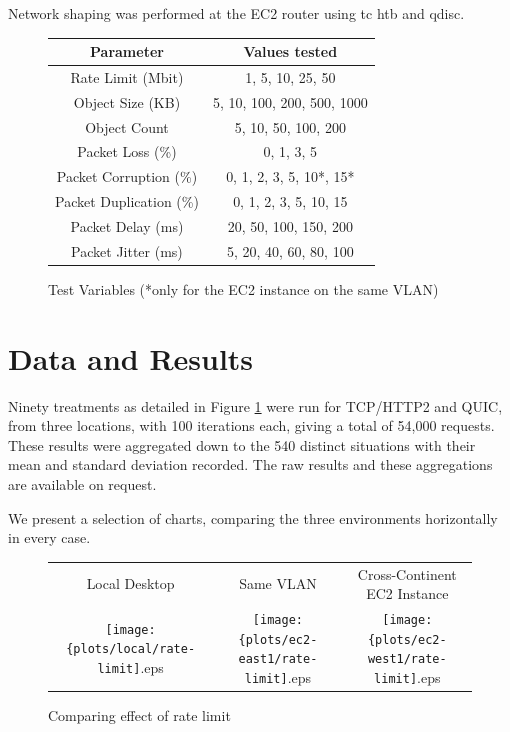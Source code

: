 \documentclass[12pt]{article}
\begin{document}
Network shaping was performed at the EC2 router using tc htb and qdisc.
\begin{figure}
\centering
\begin{tabular}{c|c}
	Parameter	&	Values tested 	\\\hline
	Rate Limit (Mbit) 	&	1, 5, 10, 25, 50	\\
	Object Size (KB)	&	5, 10, 100, 200, 500, 1000	\\
	Object Count &	5, 10, 50, 100, 200	\\
	Packet Loss (\%)	&	0, 1, 3, 5	\\
	Packet Corruption (\%) & 0, 1, 2, 3, 5, 10*, 15* \\
	Packet Duplication (\%) & 0, 1, 2, 3, 5, 10, 15 \\
	Packet Delay (ms)		&	20, 50, 100, 150, 200	\\
	Packet Jitter (ms)		& 5, 20, 40, 60, 80, 100 \\
\end{tabular}
\caption{Test Variables (*only for the EC2 instance on the same VLAN)}
\label{test_variables}
\end{figure}

\section{Data and Results}
\label{data_results}

Ninety treatments as detailed in Figure \ref{test_variables} were run for TCP/HTTP2 and QUIC, from three locations, with 100 iterations each, giving a total of 54,000 requests. These results were aggregated down to the 540 distinct situations with their mean and standard deviation recorded. The raw results and these aggregations are available on request.

We present a selection of charts, comparing the three environments horizontally in every case.

\begin{figure}[h]
\centering
\begin{tabular}{c c c}
	Local Desktop & Same VLAN & Cross-Continent EC2 Instance \\
	\texttt{[image: \{plots/local/rate-limit]}.eps} &
	\texttt{[image: \{plots/ec2-east1/rate-limit]}.eps} &
	\texttt{[image: \{plots/ec2-west1/rate-limit]}.eps} \\
\end{tabular}
\caption{Comparing effect of rate limit}
\label{figs:rate_limit}
\end{figure}
\end{document}
